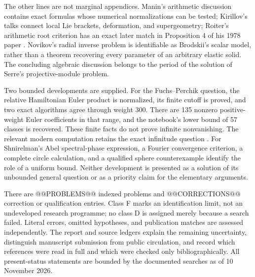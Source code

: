 The other lines are not marginal appendices. Manin's arithmetic discussion
contains exact formulas whose numerical normalizations can be tested;
Kirillov's talks connect local Lie brackets, deformation, and
supergeometry; Roiter's arithmetic root criterion has an exact later
match in Proposition 4 of his 1978 paper \citep{roiter1978roots}.
Novikov's radial inverse problem is identifiable as Brodskii's scalar
model, rather than a theorem recovering every parameter of an arbitrary
elastic solid. The concluding algebraic discussion belongs to the
period of the solution of Serre's projective-module problem.

Two bounded developments are supplied. For the Fuchs--Perchik question,
the relative Hamiltonian Euler product is normalized, its finite cutoff
is proved, and two exact algorithms agree through weight 300. There are
135 nonzero positive-weight Euler coefficients in that range, and the
notebook's lower bound of 57 classes is recovered. These finite facts do
not prove infinite nonvanishing. The relevant modern computation retains
the exact infinitude question \citep[\S2]{mohammadzadehfuchs2014cohomology}.
For Shnirelman's Abel spectral-phase expression, a Fourier convergence
criterion, a complete circle calculation, and a qualified sphere
counterexample identify the role of a uniform bound. Neither development
is presented as a solution of its unbounded general question or as a
priority claim for the elementary arguments.

There are @@PROBLEMS@@ indexed problems and @@CORRECTIONS@@ correction or
qualification entries. Class F marks an identification limit, not an
undeveloped research programme; no class D is assigned merely because a
search failed. Literal errors, omitted hypotheses, and publication matches
are assessed independently. The report and source ledgers explain the
remaining uncertainty, distinguish manuscript submission from public
circulation, and record which references were read in full and which
were checked only bibliographically. All present-status statements are
bounded by the documented searches as of 10 November 2026.
